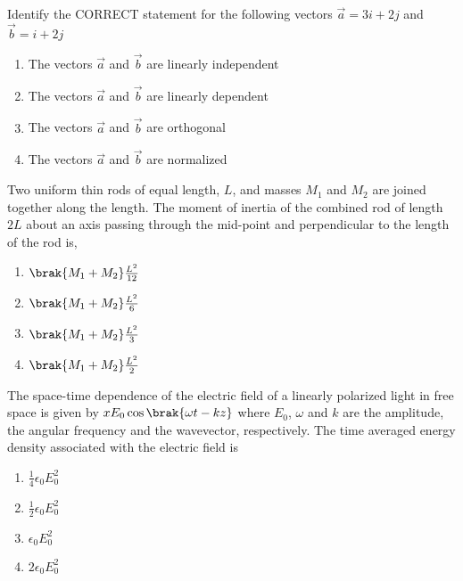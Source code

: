 \iffalse
    \author{EE24BTECH11061}
    \section{ph}
    \chapter{2012}
 \fi
\item Identify the CORRECT statement for the following vectors $\vec{a} = 3i+ 2j$ and $\vec{b} = i + 2j$
\begin{multicols}{2}
    \begin{enumerate}
        \item The vectors $\vec{a}$ and $\vec{b}$ are linearly independent
        \item The vectors $\vec{a}$ and $\vec{b}$ are linearly dependent
        \item The vectors $\vec{a}$ and $\vec{b}$ are orthogonal
        \item The vectors $\vec{a}$ and $\vec{b}$ are normalized
    \end{enumerate}
\end{multicols}

\item Two uniform thin rods of equal length, $L$, and masses $M_1$ and $M_2$ are joined together along the
length. The moment of inertia of the combined rod of length $2L$ about an axis passing through the
mid-point and perpendicular to the length of the rod is,
\begin{multicols}{2}
    \begin{enumerate}
        \item $\brak{M_1 + M_2}\frac{L^2}{12}$
        \item $\brak{M_1 + M_2}\frac{L^2}{6}$
        \item $\brak{M_1 + M_2}\frac{L^2}{3}$
        \item $\brak{M_1 + M_2}\frac{L^2}{2}$
    \end{enumerate}
\end{multicols}
    
\item The space-time dependence of the electric field of a linearly polarized light in free space is given by $xE_0 \cos{\brak{\omega t - kz}}$ where $E_0$, $\omega$ and $k$ are the amplitude, the angular frequency and the wavevector, respectively. The time averaged energy density associated with the electric field is
\begin{multicols}{2}
    \begin{enumerate}
        \item $\frac{1}{4} \epsilon_0 E_0^2$
        \item $\frac{1}{2} \epsilon_0 E_0^2$
        \item $\epsilon_0 E_0^2$
        \item $2 \epsilon_0 E_0^2$
    \end{enumerate}
\end{multicols}


